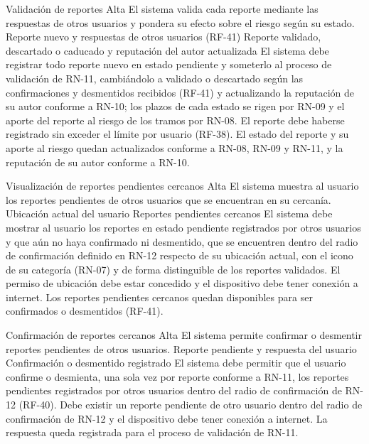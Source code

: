   {Validación de reportes}%
  {Alta}%
  {El sistema valida cada reporte mediante las respuestas de otros usuarios y pondera su efecto sobre el riesgo según su estado.}%
  {Reporte nuevo y respuestas de otros usuarios (RF-41)}%
  {Reporte validado, descartado o caducado y reputación del autor actualizada}%
  {El sistema debe registrar todo reporte nuevo en estado pendiente y someterlo al proceso de validación de RN-11, cambiándolo a validado o descartado según las confirmaciones y desmentidos recibidos (RF-41) y actualizando la reputación de su autor conforme a RN-10; los plazos de cada estado se rigen por RN-09 y el aporte del reporte al riesgo de los tramos por RN-08.}%
  {El reporte debe haberse registrado sin exceder el límite por usuario (RF-38).}%
  {El estado del reporte y su aporte al riesgo quedan actualizados conforme a RN-08, RN-09 y RN-11, y la reputación de su autor conforme a RN-10.}%

  {Visualización de reportes pendientes cercanos}%
  {Alta}%
  {El sistema muestra al usuario los reportes pendientes de otros usuarios que se encuentran en su cercanía.}%
  {Ubicación actual del usuario}%
  {Reportes pendientes cercanos}%
  {El sistema debe mostrar al usuario los reportes en estado pendiente registrados por otros usuarios y que aún no haya confirmado ni desmentido, que se encuentren dentro del radio de confirmación definido en RN-12 respecto de su ubicación actual, con el icono de su categoría (RN-07) y de forma distinguible de los reportes validados.}%
  {El permiso de ubicación debe estar concedido y el dispositivo debe tener conexión a internet.}%
  {Los reportes pendientes cercanos quedan disponibles para ser confirmados o desmentidos (RF-41).}%

  {Confirmación de reportes cercanos}%
  {Alta}%
  {El sistema permite confirmar o desmentir reportes pendientes de otros usuarios.}%
  {Reporte pendiente y respuesta del usuario}%
  {Confirmación o desmentido registrado}%
  {El sistema debe permitir que el usuario confirme o desmienta, una sola vez por reporte conforme a RN-11, los reportes pendientes registrados por otros usuarios dentro del radio de confirmación de RN-12 (RF-40).}%
  {Debe existir un reporte pendiente de otro usuario dentro del radio de confirmación de RN-12 y el dispositivo debe tener conexión a internet.}%
  {La respuesta queda registrada para el proceso de validación de RN-11.}%

